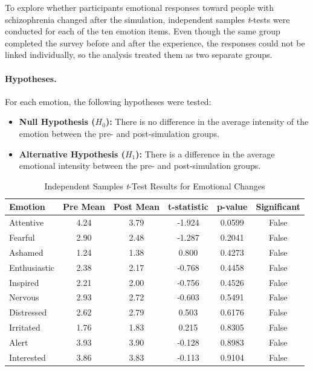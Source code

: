 To explore whether participants emotional responses toward people with schizophrenia changed after the simulation, independent samples \textit{t}-tests were conducted for each of the ten emotion items. Even though the same group completed the survey before and after the experience, the responses could not be linked individually, so the analysis treated them as two separate groups.

\paragraph{Hypotheses.} For each emotion, the following hypotheses were tested:

\begin{itemize}
    \item \textbf{Null Hypothesis ($H_0$):} There is no difference in the average intensity of the emotion between the pre- and post-simulation groups.
    \item \textbf{Alternative Hypothesis ($H_1$):} There is a difference in the average emotional intensity between the pre- and post-simulation groups.
\end{itemize}


\begin{table}[H]
\centering
\caption{Independent Samples \textit{t}-Test Results for Emotional Changes}
\begin{tabular}{|l|c|c|c|c|c|}
\hline
\textbf{Emotion} & \textbf{Pre Mean} & \textbf{Post Mean} & \textbf{t-statistic} & \textbf{p-value} & \textbf{Significant} \\
\hline
Attentive     & 4.24 & 3.79 & -1.924 & 0.0599 & False \\
Fearful       & 2.90 & 2.48 & -1.287 & 0.2041 & False \\
Ashamed       & 1.24 & 1.38 &  0.800 & 0.4273 & False \\
Enthusiastic  & 2.38 & 2.17 & -0.768 & 0.4458 & False \\
Inspired      & 2.21 & 2.00 & -0.756 & 0.4526 & False \\
Nervous       & 2.93 & 2.72 & -0.603 & 0.5491 & False \\
Distressed    & 2.62 & 2.79 &  0.503 & 0.6176 & False \\
Irritated     & 1.76 & 1.83 &  0.215 & 0.8305 & False \\
Alert         & 3.93 & 3.90 & -0.128 & 0.8983 & False \\
Interested    & 3.86 & 3.83 & -0.113 & 0.9104 & False \\
\hline
\end{tabular}
\label{tab:ttest_emotions}
\end{table}

